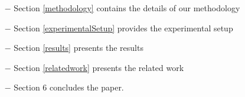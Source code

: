 \begin{itemize}
\item[$-$] Section \ref{methodology} contains the details of our methodology
\item[$-$] Section \ref{experimentalSetup} provides the experimental setup
\item[$-$] Section \ref{results} presents the results
\item[$-$] Section \ref{relatedwork} presents the related work
\item[$-$] Section 6 concludes the paper.
\end{itemize}


